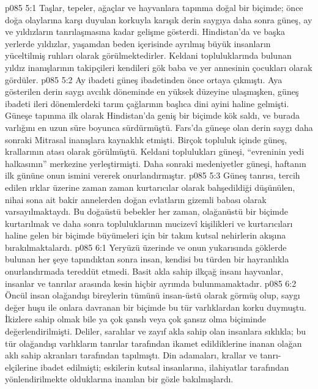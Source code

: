 \vs p085 5:1 Taşlar, tepeler, ağaçlar ve hayvanlara tapınma doğal bir biçimde; önce doğa olaylarına karşı duyulan korkuyla karışık derin saygıya daha sonra güneş, ay ve yıldızların tanrılaşmasına kadar gelişme gösterdi. Hindistan’da ve başka yerlerde yıldızlar, yaşamdan beden içerisinde ayrılmış büyük insanların yüceltilmiş ruhları olarak görülmektedirler. Keldani topluluklarında bulunan yıldız inanışlarının takipçileri kendileri gök baba ve yer annesinin çocukları olarak gördüler.
\vs p085 5:2 Ay ibadeti güneş ibadetinden önce ortaya çıkmıştı. Aya gösterilen derin saygı avcılık döneminde en yüksek düzeyine ulaşmışken, güneş ibadeti ileri dönemlerdeki tarım çağlarının başlıca dini ayini haline gelmişti. Güneşe tapınma ilk olarak Hindistan’da geniş bir biçimde kök saldı, ve burada varlığını en uzun süre boyunca sürdürmüştü. Fars’da güneşe olan derin saygı daha sonraki Mitrasal inanışlara kaynaklık etmişti. Birçok topluluk içinde güneş, krallarının atası olarak görülmüştü. Keldani toplulukları güneşi, “evreninin yedi halkasının” merkezine yerleştirmişti. Daha sonraki medeniyetler güneşi, haftanın ilk gününe onun ismini vererek onurlandırmıştır.
\vs p085 5:3 Güneş tanrısı, tercih edilen ırklar üzerine zaman zaman kurtarıcılar olarak bahşedildiği düşünülen, nihai sona ait bakir annelerden doğan evlatların gizemli babası olarak varsayılmaktaydı. Bu doğaüstü bebekler her zaman, olağanüstü bir biçimde kurtarılmak ve daha sonra topluluklarının mucizevî kişilikleri ve kurtarıcıları haline gelen bir biçimde büyümeleri için bir takım kutsal nehirlerin akışına bırakılmaktalardı.
\vs p085 6:1 Yeryüzü üzerinde ve onun yukarısında göklerde bulunan her şeye tapındıktan sonra insan, kendisi bu türden bir hayranlıkla onurlandırmada tereddüt etmedi. Basit akla sahip ilkçağ insanı hayvanlar, insanlar ve tanrılar arasında kesin hiçbir ayrımda bulunmamaktadır.
\vs p085 6:2 Öncül insan olağandışı bireylerin tümünü insan\hyp{}üstü olarak görmüş olup, saygı değer huşu ile onlara davranan bir biçimde bu tür varlıklardan korku duymuştu. İkizlere sahip olmak bile ya çok şanslı veya çok şansız olma biçiminde değerlendirilmişti. Deliler, saralılar ve zayıf akla sahip olan insanlara sıklıkla; bu tür olağandışı varlıkların tanrılar tarafından ikamet edildiklerine inanan olağan aklı sahip akranları tarafından tapılmıştı. Din adamaları, krallar ve tanrı\hyp{}elçilerine ibadet edilmişti; eskilerin kutsal insanlarına, ilahiyatlar tarafından yönlendirilmekte olduklarına inanılan bir gözle bakılmışlardı.
